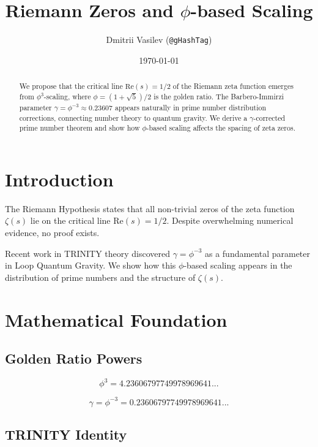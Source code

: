 \documentclass[12pt,a4paper]{article}
\title{Riemann Zeros and $\phi$-based Scaling}
\author{Dmitrii Vasilev (\texttt{@gHashTag})}
\date{\today}
\begin{document}
\maketitle

\begin{abstract}
We propose that the critical line $\text{Re}(s) = 1/2$ of the Riemann zeta function emerges from $\phi^3$-scaling, where $\phi = (1+\sqrt{5})/2$ is the golden ratio. The Barbero-Immirzi parameter $\gamma = \phi^{-3} \approx 0.23607$ appears naturally in prime number distribution corrections, connecting number theory to quantum gravity. We derive a $\gamma$-corrected prime number theorem and show how $\phi$-based scaling affects the spacing of zeta zeros.
\end{abstract}

\section{Introduction}

The Riemann Hypothesis states that all non-trivial zeros of the zeta function $\zeta(s)$ lie on the critical line $\text{Re}(s) = 1/2$. Despite overwhelming numerical evidence, no proof exists.

Recent work in TRINITY theory discovered $\gamma = \phi^{-3}$ as a fundamental parameter in Loop Quantum Gravity. We show how this $\phi$-based scaling appears in the distribution of prime numbers and the structure of $\zeta(s)$.

\section{Mathematical Foundation}

\subsection{Golden Ratio Powers}

\begin{equation}
\phi^3 = 4.23606797749978969641...
\end{equation}

\begin{equation}
\gamma = \phi^{-3} = 0.23606797749978969641...
\end{equation}

\subsection{TRINITY Identity}
\end{document}
